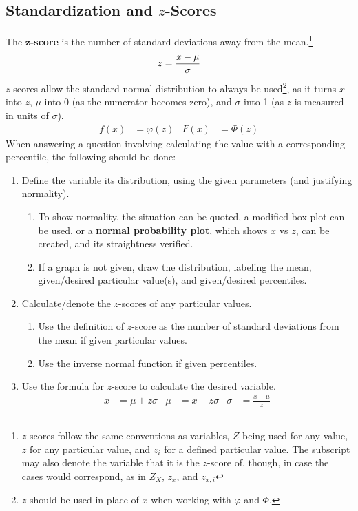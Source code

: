 \documentclass[../AP_Statistics.tex]{subfiles}
\begin{document}
			\subsection*{Standardization and $z$-Scores}
				The $\pmb{z}$\textbf{-score} is the number of standard deviations away from the mean.\footnote{$z$-scores follow the same conventions as variables, $Z$ being used for any value, $z$ for any particular value, and $z_i$ for a defined particular value. The subscript may also denote the variable that it is the $z$-score of, though, in case the cases would correspond, as in $Z_X$, $z_x$, and $z_{x,i}$}
				$$z = \frac{x - \mu}{\sigma}$$
				$z$-scores allow the standard normal distribution to always be used\footnote{$z$ should be used in place of $x$ when working with $\varphi$ and $\Phi$.}, as it turns $x$ into $z$, $\mu$ into 0 (as the numerator becomes zero), and $\sigma$ into 1 (as $z$ is measured in units of $\sigma$).
				\begin{align*}
					f(x) &= \varphi(z) & F(x) &= \Phi(z)
				\end{align*}
				When answering a question involving calculating the value with a corresponding percentile, the following should be done:
				\begin{enumerate}
					\item Define the variable its distribution, using the given parameters (and justifying normality).
					\begin{enumerate}
						\item To show normality, the situation can be quoted, a modified box plot can be used, or a \textbf{normal probability plot}, which shows $x$ vs $z$, can be created, and its straightness verified.
						\item If a graph is not given, draw the distribution, labeling the mean, given/desired particular value(s), and given/desired percentiles.
					\end{enumerate}
					\item Calculate/denote the $z$-scores of any particular values.
					\begin{enumerate}
						\item Use the definition of $z$-score as the number of standard deviations from the mean if given particular values.
						\item Use the inverse normal function if given percentiles.
					\end{enumerate}
					\item Use the formula for $z$-score to calculate the desired variable.
						\begin{align*}
							x &= \mu + z\sigma & \mu &= x - z\sigma & \sigma &= \frac{x - \mu}{z}
						\end{align*}
				\end{enumerate}
\end{document}
